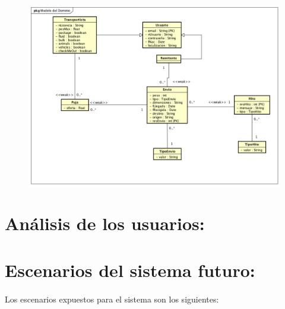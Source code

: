 \documentclass[10pt, a4paper,spanish]{article}
\begin{document}
		\begin{figure}[H]
			\centering
				\includegraphics[width=\textwidth]{astah/entidad_relacion.png}
		\end{figure}


	\section{Análisis de los usuarios:}

		\paragraph{}


	\section{Escenarios del sistema futuro:}

		\paragraph{}
		Los escenarios expuestos para el sistema son los siguientes:
\end{document}

